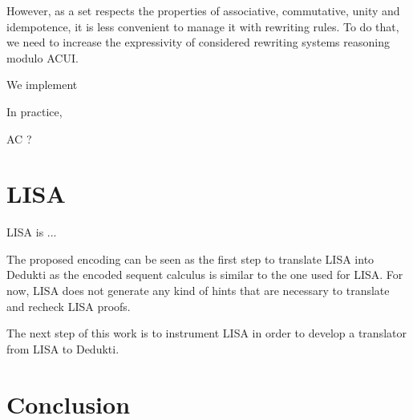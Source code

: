 \documentclass{article}
\begin{document}
	However, as a set respects the properties of associative, commutative, unity and idempotence, it is less convenient to manage it with rewriting rules.
	To do that, we need to increase the expressivity of considered rewriting systems reasoning modulo ACUI.
	
	We implement 
	
	In practice, 
	
	AC ?
	
	\section{LISA}
	
	LISA is ...
	
	The proposed encoding can be seen as the first step to translate LISA into Dedukti as the encoded sequent calculus is similar to the one used for LISA.
	For now, LISA does not generate any kind of hints that are necessary to translate and recheck LISA proofs.
	
	The next step of this work is to instrument LISA in order to develop a translator from LISA to Dedukti.
	
	
	
	\section{Conclusion}
	
\end{document}
